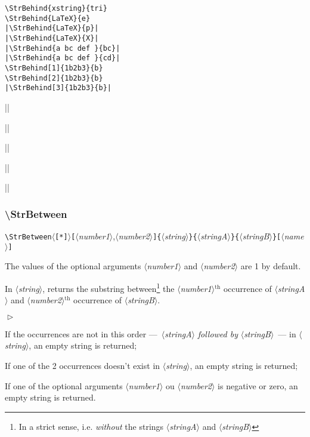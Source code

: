 \documentclass[a4paper,10pt]{article}
\newcommand\argu[1]{$\langle$\textit{#1}$\rangle$}
\newcommand\ARGU[1]{\texttt{\{}\argu{#1}\texttt{\}}}
\newcommand\arguC[1]{\texttt{[}\argu{#1}\texttt{]}}
\newcommand\arguCC[2]{\texttt{[}\argu{#1}{,}\argu{#2}\texttt{]}}
\newcommand\etoile{$\langle$\texttt{[*]}$\rangle$}
\newenvironment{Conditions}[1][1cm]%
{\begin{list}%
	{$\vartriangleright$}%
	{\setlength{\leftmargin}{#1}
	 \setlength{\itemsep}{0pt}
	 \setlength{\parsep}{0pt}
	 \setlength{\topsep}{2ptplus3ptminus2pt}
	}}%
{\end{list}}
\renewcommand\th{${}^\text{th}$\xspace}
\newcommand\styleexemple{\small\vskip4pt}
\newcommand\verbinline{\lstinline[basicstyle=\normalsize\ttfamily]}
\begin{document}
\begin{minipage}[t]{0.65\linewidth}
\begin{lstlisting}
\StrBehind{xstring}{tri}
\StrBehind{LaTeX}{e}
|\StrBehind{LaTeX}{p}|
|\StrBehind{LaTeX}{X}|
|\StrBehind{a bc def }{bc}|
|\StrBehind{a bc def }{cd}|
\StrBehind[1]{1b2b3}{b}
\StrBehind[2]{1b2b3}{b}
|\StrBehind[3]{1b2b3}{b}|
\end{lstlisting}%
\end{minipage}\hfill
\begin{minipage}[t]{0.35\linewidth}
	\styleexemple
	\par
	\par
	||\par
	||\par
	||\par
	||\par
	\par
	\par
	||
\end{minipage}%

\subsubsection{\ttfamily\textbackslash StrBetween}

\verbinline|\StrBetween|\etoile\arguCC{number1}{number2}\ARGU{string}\ARGU{stringA}\ARGU{stringB}\arguC{name}
\smallskip

The values of the optional arguments \argu{number1} and \argu{number2} are 1 by default.\par\smallskip

In \argu{string}, returns the substring between\footnote{In a strict sense, i.e. \emph{without} the strings \argu{stringA} and \argu{stringB}} the \argu{number1}\th occurrence of \argu{stringA} and \argu{number2}\th occurrence of \argu{stringB}.\medskip

\begin{Conditions}
\item If the occurrences are not in this order ---~\argu{stringA} \emph{followed by} \argu{stringB}~--- in \argu{string}, an empty string is returned;
\item If one of the 2 occurrences doesn't exist in \argu{string}, an empty string is returned;
\item  If one of the optional arguments \argu{number1} ou \argu{number2} is negative or zero, an empty string is returned.
\end{Conditions}
\end{document}
